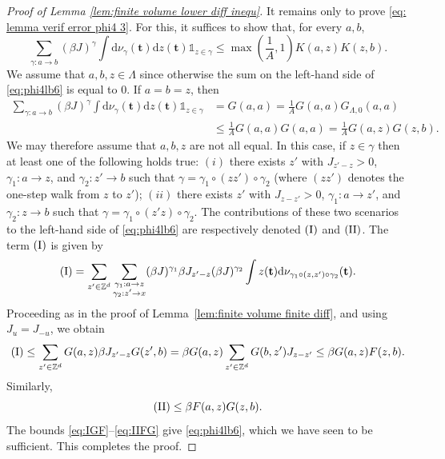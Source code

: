 \documentclass[11pt,a4paper]{article}
\numberwithin{equation}{section}
\theoremstyle{plain}
\theoremstyle{definition}
\newcommand\1{\mathds{1}}
\begin{document}
\begin{proof}[Proof of Lemma \textup{\ref{lem:finite volume lower diff inequ}}]
It remains only to prove \eqref{eq: lemma verif error phi4 3}.
For this, it suffices to show that, for every $a,b$,
    \begin{equation}
        \sum_{\gamma: a \rightarrow b }(\beta J)^{\gamma}\int \mathrm{d}\nu_{\gamma}(\mathbf{t})\mathrm{d}z(\mathbf{t}) \mathds{1}_{z\in \gamma} \leq \max\left(\frac{1}{A},1\right) K(a,z) K(z,b). \label{eq:phi4lb6}
    \end{equation}
    We assume that $a,b,z\in \Lambda$ since otherwise the sum on the left-hand side of \eqref{eq:phi4lb6} is equal to $0$. If $a=b=z$, then
    \begin{align}\nonumber
    	\sum_{\gamma: a \rightarrow b }(\beta J)^{\gamma}\int \mathrm{d}\nu_{\gamma}(\mathbf{t})\mathrm{d}z(\mathbf{t}) \mathds{1}_{z\in \gamma}
    &=G(a,a) =\frac{1}{A}G(a,a)G_{\Lambda,0}(a,a)
    	\\&\leq \frac{1}{A}G(a,a)G(a,a)\nonumber =\frac{1}{A}G(a,z)G(z,b).
    \end{align}
    We may therefore assume that $a,b,z$ are not all equal. In this case,
    if $z \in \gamma$ then at least one of the following holds true: $(i)$ there exists $z'$ with $J_{z'-z}>0$, $\gamma_1:a\rightarrow z$, and $\gamma_2:z'\rightarrow b$ such that $\gamma = \gamma_1 \circ (zz') \circ\gamma_2$ (where $(zz')$ denotes the one-step walk from $z$ to $z'$); $(ii)$ there exists $z'$ with $J_{z-z'}>0$, $\gamma_1:a\rightarrow z'$, and $\gamma_2:z\rightarrow b$ such that $\gamma = \gamma_1 \circ (z'z)\circ \gamma_2$. The contributions of these two scenarios to the left-hand side of \eqref{eq:phi4lb6} are respectively denoted $({\rm I})$ and $({\rm II})$.
The term $({\rm I})$ is given by
    \begin{equation}
        ({\rm I}) = \sum_{z'\in \mathbb Z^d}\sum_{\substack{\gamma_1:a\rightarrow z\\\gamma_2:z'\rightarrow x}} (\beta J)^{\gamma_1} \beta J_{z'-z} (\beta J)^{\gamma_2}\int z(\mathbf{t}) \mathrm{d}\nu_{\gamma_1\circ (z,z')\circ \gamma_2}(\mathbf{t}).
    \end{equation}
Proceeding as in the proof of Lemma~\ref{lem:finite volume finite diff}, and using  $J_u=J_{-u}$, we obtain
    \begin{equation}
    \label{eq:IGF}
        ({\rm I}) \leq \sum_{z'\in \mathbb Z^d}G(a,z)\beta J_{z'-z} G(z',b)=\beta G(a,z)\sum_{z'\in \mathbb Z^d}G(b,z')J_{z-z'} \leq \beta G(a,z)F(z,b).
    \end{equation}
    Similarly,
    \begin{equation}
    \label{eq:IIFG}
    	({\rm II})\leq \beta F(a,z)G(z,b).
    \end{equation}
    The bounds \eqref{eq:IGF}--\eqref{eq:IIFG} give \eqref{eq:phi4lb6},
    which we have seen to be sufficient.
    This completes the proof.
\end{proof}
\end{document}

